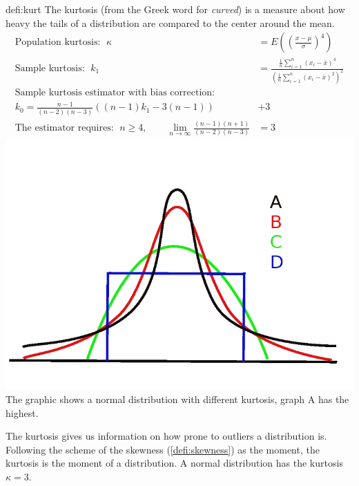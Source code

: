 		\begin{defi}[Kurtosis]{defi:kurt}
		The kurtosis (from the Greek word for \emph{curved}) is a measure about how heavy the tails of a distribution are compared to the center around the mean.
			\begin{align*}
			\text{Population kurtosis: }\;\kappa&=E\left(\left(\frac{x-\mu}{\sigma}\right)^4\right)\\
			\text{Sample kurtosis: }\; k_1&=\frac{\frac{1}{n}\sum\limits_{i=1}^n (x_i-\bar{x})^4}{\left(\frac{1}{n}\sum\limits_{i=1}^n (x_i-\bar{x})^2\right)^2}\\
			\text{Sample kurtosis estimator with bias correction: }\\
			k_0=\frac{n-1}{(n-2)(n-3)}\left((n-1)k_1-3(n-1)\right)&+3\\
			\text{The estimator requires: }\; n\geq 4,\qquad\lim\limits_{n\rightarrow\infty}\frac{(n-1)(n+1)}{(n-2)(n-3)}&=3
			\end{align*}					
			\includegraphics[width=\textwidth]{P00kurtosis.png}
			The graphic shows a normal distribution with different kurtosis, graph A has the highest.
		\end{defi}
		The kurtosis gives us information on how prone to outliers a distribution is. Following the scheme of the skewness (\ref{defi:skewness}) as the  moment, the kurtosis is the  moment of a distribution. A normal distribution has  the kurtosis $\kappa=3$.
